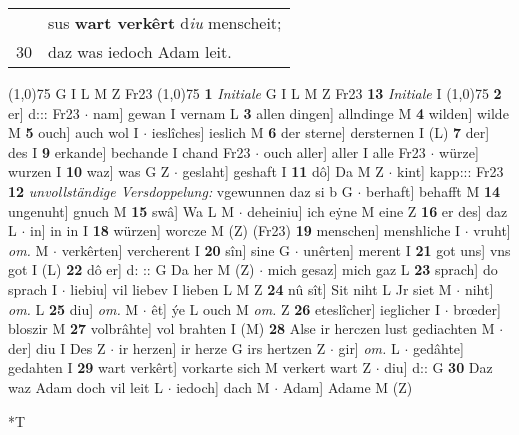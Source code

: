 \documentclass[8pt,a4paper,notitlepage]{article}
\begin{document}
\begin{table}[ht]
\begin{minipage}[t]{0.5\linewidth}
\begin{tabular}{rl}
 & sus \textbf{wart verkêrt} d\textit{iu} menscheit;\\ 
30 & daz was iedoch Adam leit.\\ 
\end{tabular}
\scriptsize
\line(1,0){75} \newline
G I L M Z Fr23 \newline
\line(1,0){75} \newline
\textbf{1} \textit{Initiale} G I L M Z Fr23  \textbf{13} \textit{Initiale} I  \newline
\line(1,0){75} \newline
\textbf{2} er] d::: Fr23  $\cdot$ nam] gewan I vernam L \textbf{3} allen dingen] allndinge M \textbf{4} wilden] wilde M \textbf{5} ouch] auch wol I  $\cdot$ ieslîches] ieslich M \textbf{6} der sterne] dersternen I (L) \textbf{7} der] des I \textbf{9} erkande] bechande I chand Fr23  $\cdot$ ouch aller] aller I alle Fr23  $\cdot$ würze] wurzen I \textbf{10} waz] was G Z  $\cdot$ geslaht] geshaft I \textbf{11} dô] Da M Z  $\cdot$ kint] kapp::: Fr23 \textbf{12} \textit{unvollständige Versdoppelung:} vgewunnen daz si b G   $\cdot$ berhaft] behafft M \textbf{14} ungenuht] gnuch M \textbf{15} swâ] Wa L M  $\cdot$ deheiniu] ich eẏne M eine Z \textbf{16} er des] daz L  $\cdot$ in] in in I \textbf{18} würzen] worcze M (Z) (Fr23) \textbf{19} menschen] menshliche I  $\cdot$ vruht] \textit{om.} M  $\cdot$ verkêrten] vercherent I \textbf{20} sîn] sine G  $\cdot$ unêrten] merent I \textbf{21} got uns] vns got I (L) \textbf{22} dô er] d: :: G Da her M (Z)  $\cdot$ mich gesaz] mich gaz L \textbf{23} sprach] do sprach I  $\cdot$ liebiu] vil liebev I lieben L M Z \textbf{24} nû sît] Sit niht L Jr siet M  $\cdot$ niht] \textit{om.} L \textbf{25} diu] \textit{om.} M  $\cdot$ êt] ýe L ouch M \textit{om.} Z \textbf{26} eteslîcher] ieglicher I  $\cdot$ brœder] bloszir M \textbf{27} volbrâhte] vol brahten I (M) \textbf{28} Alse ir herczen lust gediachten M  $\cdot$ der] diu I Des Z  $\cdot$ ir herzen] ir herze G irs hertzen Z  $\cdot$ gir] \textit{om.} L  $\cdot$ gedâhte] gedahten I \textbf{29} wart verkêrt] vorkarte sich M verkert wart Z  $\cdot$ diu] d:: G \textbf{30} Daz waz Adam doch vil leit L  $\cdot$ iedoch] dach M  $\cdot$ Adam] Adame M (Z) \newline
\end{minipage}
\hspace{0.5cm}
\begin{minipage}[t]{0.5\linewidth}
\small
\begin{center}*T
\end{center}

\end{minipage}
\end{table}
\end{document}
